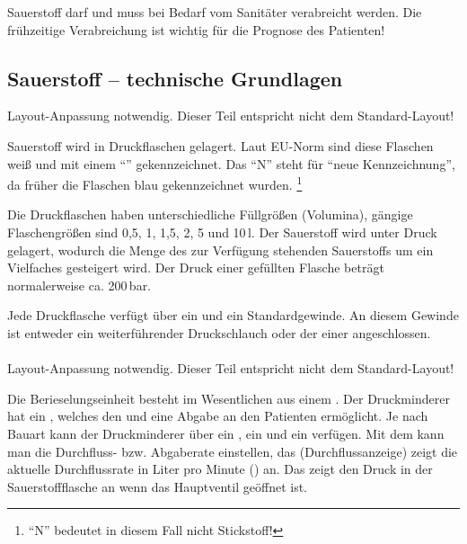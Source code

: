 Sauerstoff darf und muss bei Bedarf vom Sanitäter
verabreicht werden. Die frühzeitige Verabreichung ist wichtig für die Prognose des
Patienten!

% 

\subsection{Sauerstoff -- technische Grundlagen}
\begin{anfxwarning}[author=GABS]{Layout-Anpassung notwendig.}
   Dieser Teil entspricht nicht dem Standard-Layout!
\end{anfxwarning}
Sauerstoff wird in Druckflaschen  gelagert. Laut EU-Norm sind diese
Flaschen weiß und mit einem
"`"' gekennzeichnet.
Das "`N"' steht für "`neue Kennzeichnung"', da früher die
Flaschen blau gekennzeichnet wurden. \footnote{"`N"' bedeutet in diesem Fall nicht Stickstoff!}

Die Druckflaschen haben unterschiedliche Füllgrößen (Volumina),
gängige Flaschengrößen sind 0,5, 1, 1,5, 2, 5 und
10\,l. Der Sauerstoff wird unter Druck gelagert, wodurch die
Menge des zur Verfügung stehenden Sauerstoffs um ein Vielfaches
gesteigert wird. Der Druck einer gefüllten Flasche beträgt
normalerweise ca. 200\,bar. 

Jede Druckflasche verfügt über ein  und
ein Standardgewinde. An diesem Gewinde ist entweder ein
weiterführender Druckschlauch oder der 
einer  angeschlossen. 

\paragraph{}
\begin{anfxwarning}[author=GABS]{Layout-Anpassung notwendig.}
   Dieser Teil entspricht nicht dem Standard-Layout!
\end{anfxwarning}

Die Berieselungseinheit besteht im Wesentlichen aus einem . Der
Druckminderer hat ein , welches den  und eine
Abgabe an den Patienten ermöglicht. Je nach Bauart kann der Druckminderer über 
ein , ein  und ein 
verfügen.  Mit dem  kann man die Durchfluss- bzw. Abgaberate
ein\-stellen,  das  (Durchflussanzeige) zeigt die aktuelle
Durchflussrate in  Liter pro Minute (\LMin) an. Das   zeigt den
Druck in der Sauerstoffflasche an wenn das Haupt\-ventil geöffnet ist.

